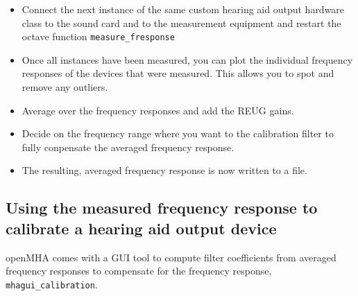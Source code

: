 \documentclass[11pt,a4paper,twoside]{article}
\newcommand{\+}{\discretionary{\mbox{\scriptsize$\hookleftarrow$}}{}{}}
\begin{document}
\begin{itemize}
\begin{itemize}
  \end{itemize}
\item
  Connect the next instance of the same custom hearing aid output
  hardware class to the sound card and to the measurement equipment and restart
  the octave function \texttt{measure\_fresponse}
\item
  Once all instances have been measured, you can plot the individual frequency
  responses of the devices that were measured.  This allows you to spot
  and remove any outliers.
\item
  Average over the frequency responses and add the REUG gains.
\item
  Decide on the frequency range where you want to the calibration
  filter to fully conpensate the averaged frequency response.
\item
  The resulting, averaged frequency response is now written to a file.
\end{itemize}



\subsection{Using the measured frequency response to calibrate a hearing aid output device}

openMHA comes with a GUI tool to compute filter coefficients from
averaged frequency responses to compensate for the frequency response,
\texttt{mhagui\_calibration}.



\printindex
\end{document}
